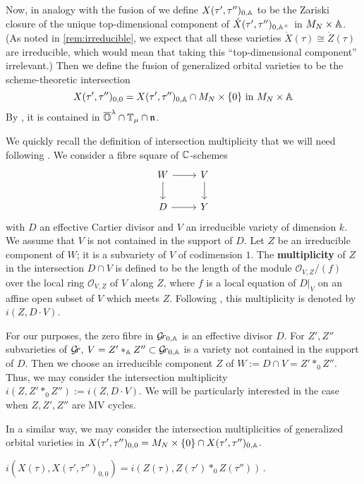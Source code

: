 \documentclass{article}
\begin{document}
Now, in analogy with the fusion of  we define $X(\tau',\tau'')_{0,\AA}$ to be the Zariski closure of the unique top-dimensional component of $\mathring X(\tau',\tau'')_{0,\AA^\times}$ in $M_N \times\AA$.  (As noted in \cref{rem:irreducible}, we expect that all these varieties $ \mathring X(\tau) \cong \mathring Z(\tau) $ are irreducible, which would mean that taking this ``top-dimensional component'' irrelevant.)  Then we define the fusion of generalized orbital varieties to be the scheme-theoretic intersection 
$$ X(\tau', \tau'')_{0,0}  = X(\tau',\tau'')_{0,\AA} \cap M_N \times \{0\} \text{ in $M_N \times\AA$} $$
By , it is contained in $\overline\OO^\lambda\cap\TT_\mu\cap\n$. 

We quickly recall the definition of intersection multiplicity that we will need following \cite[Example~2.6.5]{fulton2016intersection}. We consider a fibre square of $\CC$-schemes
$$
\begin{tikzcd}
   W\ar[r]\ar[d]&V\ar[d]\\D\ar[r]&Y
\end{tikzcd}
$$
with $D $ an effective Cartier divisor and $V$ an
irreducible variety of dimension $k$. We assume that $V$ is not contained
in the support of $D$. Let $Z$ be an irreducible component of $W$;
it is a subvariety of $V$ of codimension $1$. The \textbf{multiplicity}
of $Z$ in the intersection $D\cap V$ is defined to be the length of the
module $\mathcal O_{V,Z}/(f)$ over the local ring $\mathcal O_{V,Z}$
of $V$ along $Z$, where $f$ is a local equation of $D|_V$ on an affine
open subset of $V$ which meets $Z$. Following \cite[chap.~7]{fulton2016intersection},
this multiplicity is denoted by $i(Z,D\cdot V)$.  

For our purposes, the zero fibre in $\Grbd$ is an effective divisor $D$.   
For $ Z', Z'' $ subvarieties of $ \Gr $, $V = Z'\ast_\AA Z''\subset\Grbd$ is a variety not contained in the support of $D$.  Then we choose an irreducible component $Z$ of $W := D \cap V = Z'\ast_0 Z''$.  Thus, we may consider the intersection multiplicity $ i(Z, Z'\ast_0 Z'') := i(Z, D \cdot V)$.  
We will be particularly interested in the case when $ Z, Z', Z''$ are MV cycles.

In a similar way, we may consider the intersection multiplicities of generalized orbital varieties in $X(\tau', \tau'')_{0,0} = M_N \times \{0\} \cap X(\tau', \tau'')_{0, \AA}$.
\begin{corollary}
\label{cor:intmul}
    $i(X(\tau), X(\tau',\tau'')_{0,0}) = i( Z(\tau), Z(\tau')\ast_0 Z(\tau''))\,.$
\end{corollary}
\end{document}
